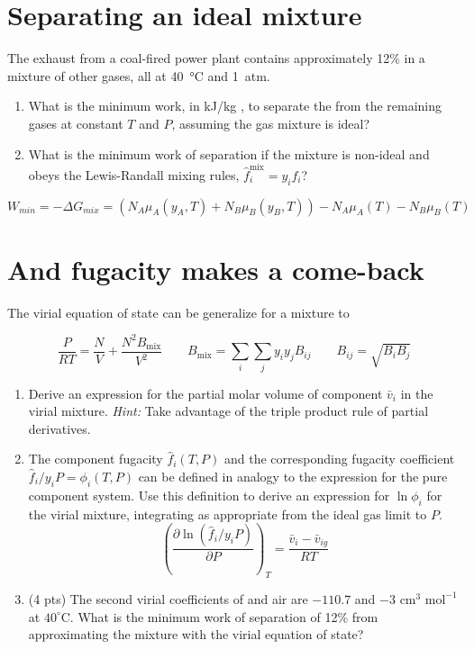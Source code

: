 \documentclass[11pt]{article}
\begin{document}
\section{Separating an ideal mixture}
\label{sec:org354ecb5}
The exhaust from a coal-fired power plant contains approximately 12\%  in a
  mixture of other gases, all at \SI{40}{\celsius} and \SI{1}{atm}.

\begin{enumerate}
\item What is the minimum work, in kJ/kg , to separate the  from the
remaining gases at constant \(T\) and \(P\), assuming the gas mixture is ideal?

\item What is the minimum work of separation if the mixture is non-ideal and obeys the
Lewis-Randall mixing rules, \(\hat{f}_i^{\text{mix}} = y_i f_i\)?
\end{enumerate}

\[
W_{min} = -\Delta G_{mix} = (N_A \mu_A(y_A,T) + N_B \mu_B(y_B,T)) - N_A \mu_A(T) - N_B \mu_B(T)
\]

\section{And fugacity makes a come-back}
\label{sec:org5de4da3}
The virial equation of state can be generalize for a mixture to

\begin{equation*}
  \frac{P}{RT} = \frac{N}{V} + \frac{N^2 B_\text{mix}}{V^2} \qquad B_\text{mix} =
  \sum_i\sum_j y_iy_j B_{ij} \qquad B_{ij} = \sqrt{B_iB_j}
\end{equation*}

\begin{enumerate}
\item Derive an expression for the partial molar volume of component \(\bar v_{i}\) in the virial
mixture.  \textit{Hint:} Take advantage of the triple product rule of partial derivatives.

\item The component fugacity \(\hat{f}_{i}(T,P)\) and the corresponding fugacity coefficient \(\hat{f}_i/y_i
   P = \phi_i(T,P)\) can be defined in analogy to the expression for the pure component system.
Use this definition to derive an expression for \(\ln \phi_i\) for the virial
mixture, integrating as appropriate from the ideal gas limit to \(P\).
\begin{equation}
  \left ( \frac{\partial\ln\left(\hat{f}_{i}/y_{i}P\right)}{\partial P} \right )_{T} = \frac{\bar{v}_{i} - \bar{v}_{ig}}{RT}
\end{equation}

\item (4 pts) The second virial coefficients of  and air are \(-110.7\) and
\(-3 \text{ cm}^3 \text{ mol}^{-1}\) at \(40^\circ\)C. What is the minimum work of
separation of 12\%  from  approximating the mixture with the
virial equation of state?
\end{enumerate}
\end{document}
